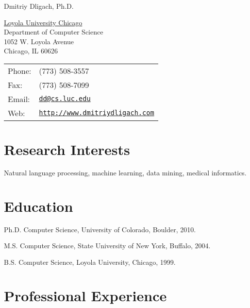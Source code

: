 \documentclass[letterpaper]{article}
\def\name{Dmitriy Dligach, Ph.D.}
\renewenvironment{itemize}{
  \begin{list}{}{
    \setlength{\leftmargin}{1.5em}
  }
}{
  \end{list}
}
\begin{document}
{\huge \name}

\vspace{0.25in}

\begin{minipage}{0.45\linewidth}
\href{http://www.luc.edu}{Loyola University Chicago} \\
Department of Computer Science \\
1052 W. Loyola Avenue \\
Chicago, IL 60626
\end{minipage}
\begin{minipage}{0.45\linewidth}
\begin{tabular}{ll}
Phone: & (773) 508-3557\\
Fax: &  (773) 508-7099 \\
Email: & \href{mailto:dd at cs.luc.edu}{\tt dd@cs.luc.edu} \\
Web: & \href{http://www.dmitriydligach.com}{\tt http://www.dmitriydligach.com} \\
\end{tabular}
\end{minipage}

\section*{Research Interests}

Natural language processing, machine learning, data mining, medical informatics.

\section*{Education}

\begin{itemize}
\item Ph.D. Computer Science, University of Colorado, Boulder, 2010.
\item M.S. Computer Science, State University of New York, Buffalo, 2004.
\item B.S. Computer Science, Loyola University, Chicago, 1999.
\end{itemize}

\section*{Professional Experience}
\end{document}
